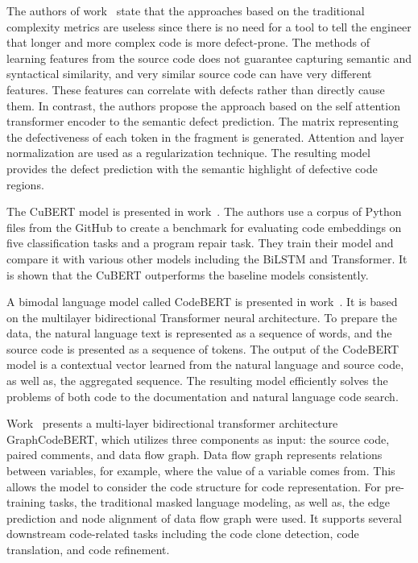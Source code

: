 \documentclass[mathematics,review,submit,moreauthors,pdftex]{Definitions/mdpi}
\begin{document}
The authors of work~\cite{HumphreysDam2019} state that the approaches based on the traditional complexity metrics are useless since there is no need for a tool to tell the engineer that longer and more complex code is more defect-prone. The methods %
of learning features from the source code does not guarantee capturing semantic and syntactical similarity, and very similar source code can have very different features. These features can correlate with defects rather than directly cause them.
In contrast, the authors propose the approach based on the self attention transformer encoder to the semantic defect prediction. The matrix representing the defectiveness of each token in the fragment is generated. Attention and layer normalization are used as a regularization technique. The resulting model provides the defect prediction with the semantic highlight of defective code regions.

The CuBERT model is presented in work~\cite{KanadeEtAl2019}. The authors use a corpus of Python files from the GitHub to create a benchmark for evaluating code embeddings on five classification tasks and a program repair task.
They train their model and compare it with various other models including the BiLSTM and Transformer.
It is shown that the CuBERT outperforms the baseline models consistently.

A bimodal language model called CodeBERT is presented in work~\cite{FengEtAl2020}. It is based on the multilayer bidirectional Transformer neural architecture. To prepare the data, the natural language text is represented as a sequence of words, and the source code is presented as a sequence of tokens.
The output of the CodeBERT model is a contextual vector learned from the natural language and source code, as well as, the aggregated sequence.
The resulting model efficiently solves the problems of both code to the documentation and natural language code search. 

Work~\cite{guo2021graphcodebert} presents a multi-layer bidirectional transformer architecture GraphCodeBERT, which utilizes three components as input: the source code, paired comments, and data flow graph. Data flow graph represents relations between variables, for example, where the value of a variable comes from. This allows the model to consider the code structure for code representation. For pre-training tasks, the traditional masked language modeling, as well as, the edge prediction and node alignment of data flow graph were used.
It supports several downstream code-related tasks including the code clone detection, code translation, and code refinement.
\end{document}
